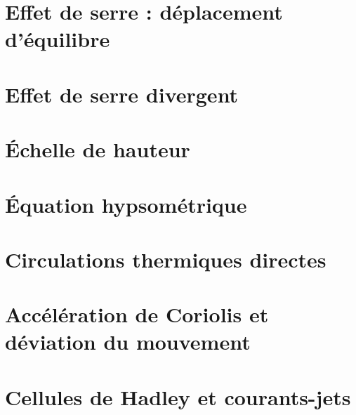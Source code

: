 \documentclass[a4paper,DIV16,10pt]{scrartcl}
\begin{document}
\newpage
\section{Effet de serre : déplacement d'équilibre}


\newpage
\section{Effet de serre divergent}


\newpage
\section{\'Echelle de hauteur}

\section{\'Equation hypsométrique}


\newpage
\section{Circulations thermiques directes}



\newpage
\section{Accélération de Coriolis et déviation du mouvement}
	

\newpage
\section{Cellules de Hadley et courants-jets}

\end{document}
